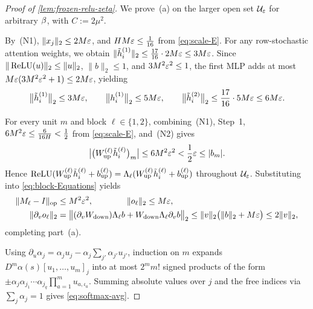 \begin{proof}[Proof of \cref{lem:frozen-relu-zeta}]
We prove~(a) on the larger open set $\mathcal U_{\varepsilon}$ for arbitrary $\beta$, with $C := 2\mu^2$.

By~(N1), $\|x_j\|_2 \le 2M\varepsilon$, and $H M\varepsilon \le \frac{1}{16}$ from \cref{eq:scale-E}. For any row-stochastic attention weights, we obtain $\|\tilde h_i^{(1)}\|_2 \le \frac{17}{16}\cdot 2M\varepsilon \le 3M\varepsilon$. Since $\|\operatorname{ReLU}(u)\|_2 \le \|u\|_2$, $\|b\|_2 \le 1$, and $3M^2\varepsilon^2 \le 1$, the first MLP adds at most $M\varepsilon(3M^2\varepsilon^2+1) \le 2M\varepsilon$, yielding
\[
  \bigl\|\tilde h_i^{(1)}\bigr\|_2 \le 3M\varepsilon, \qquad
  \bigl\|h_i^{(1)}\bigr\|_2 \le 5M\varepsilon, \qquad
  \bigl\|\tilde h_i^{(2)}\bigr\|_2 \le \frac{17}{16}\cdot 5M\varepsilon \le 6M\varepsilon.
\]

For every unit $m$ and block $\ell \in \{1,2\}$, combining~(N1), Step~1, $6M^2\varepsilon \le \frac{6}{16H} < \frac{1}{2}$ from \cref{eq:scale-E}, and~(N2) gives
\[
  \bigl|\bigl(W_{\mathrm{up}}^{(\ell)}\tilde h_i^{(\ell)}\bigr)_m\bigr|
  \le 6M^2\varepsilon^2 < \frac{1}{2}\varepsilon \le |b_m|.
\]
Hence $\operatorname{ReLU}(W_{\mathrm{up}}^{(\ell)}\tilde h_i^{(\ell)} + b_{\mathrm{up}}^{(\ell)}) = \Lambda_\ell(W_{\mathrm{up}}^{(\ell)}\tilde h_i^{(\ell)} + b_{\mathrm{up}}^{(\ell)})$ throughout $\mathcal U_{\varepsilon}$. Substituting into \cref{eq:block-Equations} yields
\begin{align*}
  \|M_\ell - I\|_{\mathrm{op}} &\le M^2\varepsilon^2, \qquad\qquad \|o_\ell\|_2 \le M\varepsilon,\\
  \|\partial_v o_\ell\|_2 &= \bigl\|(\partial_v W_{\mathrm{down}})\Lambda_\ell b + W_{\mathrm{down}}\Lambda_\ell\partial_v b\bigr\|_2 \le \|v\|_2\bigl(\|b\|_2 + M\varepsilon\bigr) \le 2\|v\|_2,
\end{align*}
completing part~(a).

Using $\partial_u\alpha_j = \alpha_j u_j - \alpha_j\sum_{j'}\alpha_{j'}u_{j'}$, induction on $m$ expands $D^m\alpha(s)[u_1,\ldots,u_m]_j$ into at most $2^m m!$ signed products of the form $\pm\alpha_j\alpha_{j_1}\cdots\alpha_{j_q}\prod_{a=1}^m u_{a,\iota_a}$. Summing absolute values over $j$ and the free indices via $\sum_j\alpha_j = 1$ gives \cref{eq:softmax-avg}.
\end{proof}

